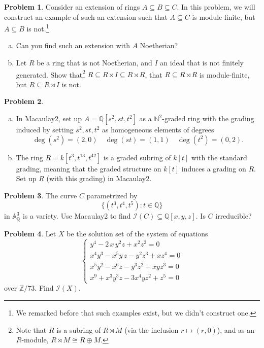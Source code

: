 \documentclass[11pt]{article}
\theoremstyle{definition}
\newtheorem{problem}{Problem}
\begin{document}
\vfill


\begin{problem} Consider an extension of rings $A \subseteq B \subseteq C$. In this problem, we will construct an example of such an extension such that $A \subseteq C$ is module-finite, but $A \subseteq B$ is not.\footnote{We remarked before that such examples exist, but we didn't construct one.}

\begin{enumerate}[a)]
\item Can you find such an extension with $A$ Noetherian?
\item Let $R$ be a ring that is not Noetherian, and $I$ an ideal that is not finitely generated. Show that\footnote{Note that $R$ is a subring of $R\rtimes M$ (via the inclusion $r\mapsto (r,0)$), and as an $R$-module, $R\rtimes M\cong R\oplus M$.} ${R \subseteq R \rtimes I \subseteq R \rtimes R}$, that $R \subseteq R \rtimes R$ is module-finite, but  $R \subseteq R \rtimes I$ is not.
\end{enumerate}
\end{problem}

\vfill

\begin{problem}$\,$
	\begin{enumerate}[a)]
		\item In Macaulay2, set up $A = \mathbb{Q}[s^2,st,t^2]$ as a $\mathbb{N}^2$-graded ring with the grading induced by setting $s^2, st, t^2$ as homogeneous elements of degrees
		$$\deg(s^2) = (2,0) \quad \deg(st) = (1,1) \quad \deg(t^2) = (0,2).$$
		\item The ring $R=k[t^3,t^{13},t^{42}]$ is a graded subring of $k[t]$ with the standard grading, meaning that the graded structure on $k[t]$ induces a grading on $R$. Set up $R$ (with this grading) in Macaulay2.
	\end{enumerate}
\end{problem}

\vfill

\newpage

\begin{problem}
The curve $C$ parametrized by 
$$\lbrace (t^3,t^4,t^5): t \in \mathbb{Q} \rbrace$$
in $\mathbb{A}^3_{\mathbb{Q}}$ is a variety. Use Macaulay2 to find $\mathcal{I}(C) \subseteq \mathbb{Q}[x,y,z]$. Is $C$ irreducible?
\end{problem}


\begin{problem}
	Let $X$ be the solution set of the system of equations
	$$\left\lbrace \begin{array}{l} y^{4}-2\,x\,y^{2}z+x^{2}z^{2} = 0 \\ x^{4}y^{3}-x^{5}y\,z-y^2 z^3 + x z^4 = 0 \\ x^5 y^2 - x^6 z - y^3 z^2 + x y z^{3} = 0 \\ x^9+x^3 y^3 z - 3 x^4 y z^2 + z^5 = 0 \end{array} \right.$$
	over $\mathbb{Z}/73$. Find $\mathcal{I}(X)$.
\end{problem}
\end{document}
